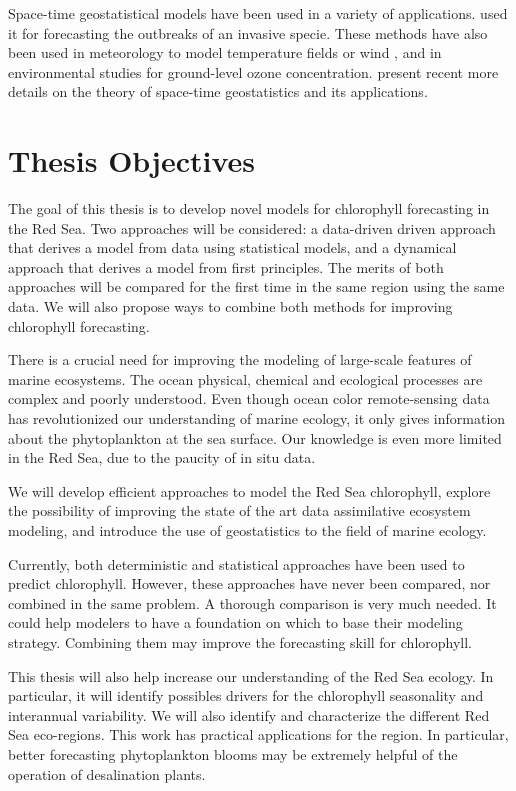 Space-time geostatistical models have been used in a variety of applications.
\citet{Hohn1993} used it for forecasting the outbreaks of an invasive specie.
These methods have also been used in meteorology to model temperature fields
\citep{Handcock1994, North2011} or wind \citep{Cressie1999, Gneiting2002}, and
in environmental studies for ground-level ozone concentration.
\citet{Gneiting2007, Gneiting2010} present recent more details on the theory of
space-time geostatistics and its applications.

\section{Thesis Objectives}

The goal of this thesis is to develop novel models for chlorophyll forecasting
in the Red Sea. Two approaches will be considered: a data-driven driven
approach that derives a model from data using statistical models, and a
dynamical approach that derives a model from first principles. The merits of
both approaches will be compared for the first time in the same region using
the same data. We will also propose ways to combine both methods for improving
chlorophyll forecasting.

There is a crucial need for improving the modeling of large-scale features of
marine ecosystems. The ocean physical, chemical and ecological processes are
complex and poorly understood. Even though ocean color remote-sensing data has
revolutionized our understanding of marine ecology, it only gives information
about the phytoplankton at the sea surface. Our knowledge is even more limited
in the Red Sea, due to the paucity of in situ data.

We will develop efficient approaches to model the Red Sea chlorophyll,
explore the possibility of improving the state of the art data assimilative
ecosystem modeling, and introduce the use of geostatistics to the field of
marine ecology.

Currently, both deterministic and statistical approaches have been used to
predict chlorophyll. However, these approaches have never been compared, nor
combined in the same problem. A thorough comparison is very much needed. It
could help modelers to have a foundation on which to base their modeling
strategy. Combining them may improve the forecasting skill for chlorophyll.

This thesis will also help increase our understanding of the Red Sea ecology.
In particular, it will identify possibles drivers for the chlorophyll
seasonality and interannual variability. We will also identify and characterize
the different Red Sea eco-regions. This work has practical applications for the
region. In particular, better forecasting phytoplankton blooms may be extremely
helpful of the operation of desalination plants.
